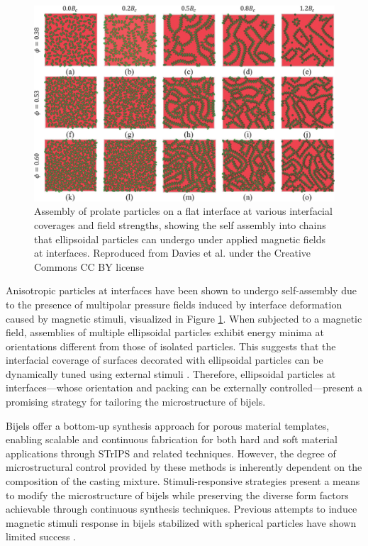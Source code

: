 \begin{figure}[h]
    \centering
    \includegraphics[scale = 0.4]{figures/introduction/anisotropic_particles_assembly.jpg}
    \caption{Assembly of prolate particles on a flat interface at various interfacial coverages and field strengths,
             showing the self assembly into chains that ellipsoidal particles can undergo under applied magnetic fields at
             interfaces. Reproduced from Davies et al. under the Creative Commons CC BY license \cite{davies_assembling_2014}}
    \label{fig:anisotropic_assembly}
\end{figure}

Anisotropic particles at interfaces have been shown to undergo self-assembly due to the presence of multipolar pressure fields induced by interface 
deformation caused by magnetic stimuli, visualized in Figure \ref{fig:anisotropic_assembly}. \cite{bresme_orientational_2007, davies_interface_2014}
When subjected to a magnetic field, assemblies of multiple ellipsoidal particles exhibit energy minima at orientations different from those of isolated 
particles. This suggests that the interfacial coverage of surfaces decorated with ellipsoidal particles can be dynamically tuned using external 
stimuli \cite{newton_influence_2014, newton_capillary_2018}. Therefore, ellipsoidal particles at interfaces—whose orientation and packing can be externally 
controlled—present a promising strategy for tailoring the microstructure of bijels.  

Bijels offer a bottom-up synthesis approach for porous material templates, enabling scalable and continuous fabrication for both hard and soft material 
applications through STrIPS and related techniques. However, the degree of microstructural control provided by these methods is inherently dependent on 
the composition of the casting mixture. Stimuli-responsive strategies present a means to modify the microstructure of bijels while preserving the 
diverse form factors achievable through continuous synthesis techniques. Previous attempts to induce magnetic stimuli response in bijels stabilized 
with spherical particles have shown limited success \cite{kim_bijels_2010}.  

